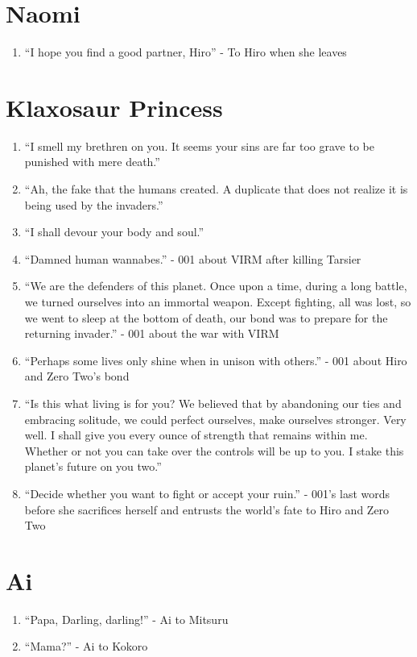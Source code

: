 \documentclass{book}
\numberwithin{equation}{section}
\begin{document}
\section{Naomi}
\begin{enumerate}
    \item ``I hope you find a good partner, Hiro'' - To Hiro when she leaves
\end{enumerate}

\section{Klaxosaur Princess}
\begin{enumerate}
    \item ``I smell my brethren on you. It seems your sins are far too grave to be punished with mere death.''
    \item ``Ah, the fake that the humans created. A duplicate that does not realize it is being used by the invaders.''
    \item ``I shall devour your body and soul.''
    \item ``Damned human wannabes.'' - 001 about VIRM after killing Tarsier
    \item ``We are the defenders of this planet. Once upon a time, during a long battle, we turned ourselves into an immortal weapon. Except fighting, all was lost, so we went to sleep at the bottom of death, our bond was to prepare for the returning invader.'' - 001 about the war with VIRM
    \item ``Perhaps some lives only shine when in unison with others.'' - 001 about Hiro and Zero Two's bond
    \item ``Is this what living is for you? We believed that by abandoning our ties and embracing solitude, we could perfect ourselves, make ourselves stronger. Very well. I shall give you every ounce of strength that remains within me. Whether or not you can take over the controls will be up to you. I stake this planet's future on you two.''
    \item ``Decide whether you want to fight or accept your ruin.'' - 001's last words before she sacrifices herself and entrusts the world's fate to Hiro and Zero Two
\end{enumerate}

\section{Ai}
\begin{enumerate}
    \item ``Papa, Darling, darling!'' - Ai to Mitsuru
    \item ``Mama?'' - Ai to Kokoro
\end{enumerate}
\end{document}
